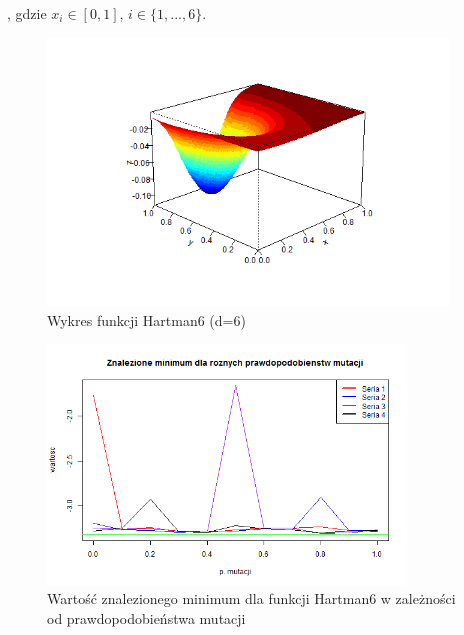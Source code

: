\documentclass[11pt, a4paper]{article}
\begin{document}
, gdzie $ x_i \in [0, 1] $, $ i \in \{1, ..., 6\} $.

\begin{figure}[H]
	\begin{center}
		\includegraphics[width=0.95\textwidth]{./assets/Hartman61.png}
		\caption{Wykres funkcji Hartman6 (d=6)}
		\label{fig:hartman61}
	\end{center}
\end{figure}

\begin{figure}[H]
	\begin{center}
		\includegraphics[width=0.85\textwidth]{./assets/Hartman62.png}
		\caption{Wartość znalezionego minimum dla funkcji Hartman6 w zależności od prawdopodobieństwa mutacji}
		\label{fig:hartman62}
	\end{center}
\end{figure}
\end{document}
